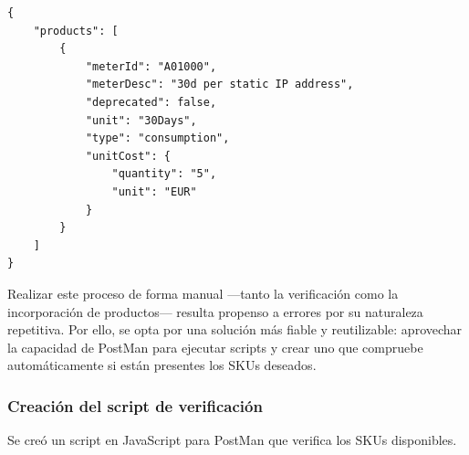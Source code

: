 \begin{lstlisting}[caption=Ejemplo de producto en API de IONOS, label=lst:producto-json]
{
    "products": [
        {
            "meterId": "A01000",
            "meterDesc": "30d per static IP address",
            "deprecated": false,
            "unit": "30Days",
            "type": "consumption",
            "unitCost": {
                "quantity": "5",
                "unit": "EUR"
            }
        }
    ]
}
\end{lstlisting}

Realizar este proceso de forma manual ---tanto la verificación como la incorporación de productos--- resulta propenso a errores por su naturaleza repetitiva. Por ello, se opta por una solución más fiable y reutilizable: aprovechar la capacidad de PostMan para ejecutar scripts y crear uno que compruebe automáticamente si están presentes los SKUs deseados.

\subsubsection{Creación del script de verificación}
\label{iteraciones:script-verificacion-postman}

Se creó un script en JavaScript para PostMan que verifica los SKUs disponibles.

